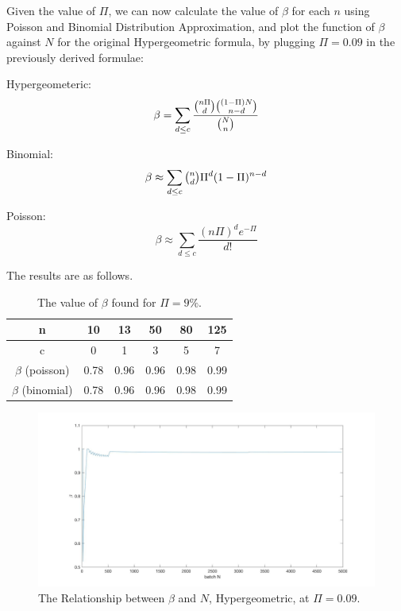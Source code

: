 \documentclass[a4paper]{article}
\begin{document}
Given the value of $\Pi$, we can now calculate the value of $\beta$ for each $n$ using Poisson and Binomial Distribution Approximation, and plot the function of $\beta$ against $N$ for the original Hypergeometric formula, by plugging $\Pi=0.09$ in the previously derived formulae:

Hypergeometeric:
$$\beta =  \sum_{d\leq c} \displaystyle\frac{\tbinom{n\Pi}{d}\tbinom{(1-\Pi)N}{n-d}}{\tbinom{N}{n}}$$

Binomial:
$$\beta \approx \sum_{d\leq c}\tbinom{n}{d}\Pi^d(1-\Pi)^{n-d}$$

Poisson:
$$\beta \approx \sum_{d\leq c} \frac{(n\Pi)^de^{-\Pi}}{d!}$$

The results are as follows.

\begin{table}[!htbp]
  \centering
    \begin{tabular}{|c|c|c|c|c|c|}
    \hline
    n     & 10    & 13    & 50    & 80    & 125 \\
    \hline
    c     & 0     & 1     & 3     & 5     & 7 \\
    \hline
    $\beta$ (poisson) & 0.78  & 0.96  & 0.96  & 0.98  & 0.99  \\
    \hline
    $\beta$ (binomial) & 0.78  & 0.96  & 0.96  & 0.98  & 0.99  \\
    \hline
    \end{tabular}%
    \caption{The value of $\beta$ found for $\Pi=9\%$.}
\end{table}%

\begin{figure}[!htbp] 
\centering 
\includegraphics[width=1\linewidth]{beta-N.jpg}  
\caption{The Relationship between $\beta$ and $N$, Hypergeometric, at $\Pi=0.09$.} 
\end{figure}

\newpage
\end{document}
